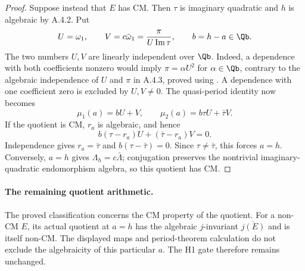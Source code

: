 \begin{proof}
Suppose instead that $E$ has CM. Then $\tau$ is imaginary quadratic
and $h$ is algebraic by A.4.2. Put
\[
 U=\omega_1,\qquad
 V=c\bar\omega_1=\frac{\pi}{U\operatorname{Im}\tau},\qquad
 b=h-a\in\Qb.
\]
The two numbers $U,V$ are linearly independent over $\Qb$.
Indeed, a dependence with both coefficients nonzero would imply
$\pi=\alpha U^2$ for $\alpha\in\Qb$, contrary to the algebraic
independence of $U$ and $\pi$ in A.4.3, proved using
\cite[Corollary 2, p.343]{EllChudnovsky1978}.
A dependence with one coefficient zero is excluded by $U,V\ne0$.
The quasi-period identity now becomes
\[
 \mu_1(a)=bU+V,\qquad
 \mu_2(a)=b\tau U+\bar\tau V.
\]
If the quotient is CM, $r_a$ is algebraic, and hence
\[
 b(\tau-r_a)U+(\bar\tau-r_a)V=0.
\]
Independence gives $r_a=\bar\tau$ and
$b(\tau-\bar\tau)=0$. Since $\tau\ne\bar\tau$, this forces
$a=h$. Conversely, $a=h$ gives $\Lambda_h=c\bar\Lambda$;
conjugation preserves the nontrivial imaginary-quadratic
endomorphism algebra, so this quotient has CM.
\end{proof}

\paragraph{The remaining quotient arithmetic.}
The proved classification concerns the CM property of the quotient.
For a non-CM $E$, its actual quotient at $a=h$ has the algebraic
$j$-invariant $\overline{j(E)}$ and is itself non-CM. The displayed
maps and period-theorem calculation do not exclude the algebraicity
of this particular $a$. The H1 gate therefore remains unchanged.
